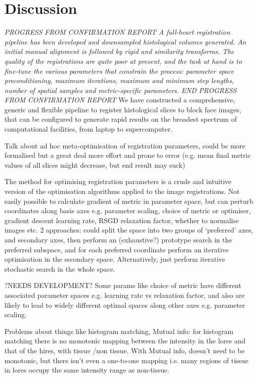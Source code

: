 
\section{Discussion} %
\label{sec:discussion}

\textit{PROGRESS FROM CONFIRMATION REPORT 
A full-heart registration pipeline has been developed and downsampled histological volumes generated. An initial manual alignment is followed by rigid and similarity transforms. The quality of the registrations are quite poor at present, and the task at hand is to fine-tune the various parameters that constrain the process: parameter space preconditioning, maximum iterations, maximum and minimum step lengths, number of spatial samples and metric-specific parameters.
END PROGRESS FROM CONFIRMATION REPORT
}
    We have constructed a comprehensive, generic and flexible pipeline to register histological slices to block face images, that can be configured to generate rapid results on the broadest spectrum of computational facilities, from laptop to supercomputer.
    
    Talk about ad hoc meta-optimisation of registration parameters, could be more formalised but a great deal more effort and prone to error (e.g. mean final metric values of all slices might decrease, but end result may suck)
    
    The method for optimising registration parameters is a crude and intuitive version of the optimisation algorithms applied to the image registrations. Not easily possible to calculate gradient of metric in parameter space, but can perturb coordinates along basis axes e.g. parameter scaling, choice of metric or optimiser, gradient descent learning rate, RSGD relaxation factor, whether to normalise images etc. 2 approaches: could split the space into two groups of `preferred' axes, and secondary axes, then perform an (exhaustive?) prototype search in the preferred subspace, and for each preferred coordinate perform an iterative optimisation in the secondary space. Alternatively, just perform iterative stochastic search in the whole space.
    
    ?NEEDS DEVELOPMENT? Some params like choice of metric have different associated parameter spaces e.g. learning rate vs relaxation factor, and also are likely to lead to widely different optimal spaces along other axes e.g. parameter scaling.
    
    Problems about things like histogram matching, Mutual info: for histogram matching there is no monotonic mapping between the intensity in the lores and that of the hires, with tissue /non tissue. With Mutual info, doesn't need to be monotonic, but there isn't even a one-to-one mapping i.e. many regions of tissue in lores occupy the same intensity range as non-tissue.
    
